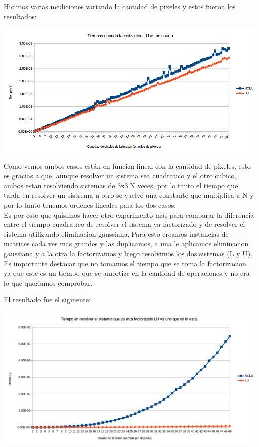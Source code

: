 Hicimos varias mediciones variando la cantidad de pixeles y estos fueron los resultados:

{\centering
    \includegraphics[scale=0.7]{informe/imagenes/LUVSNOLU.PNG} \\
}

Como vemos ambos casos están en funcion lineal con la cantidad de pixeles, esto es gracias a que, aunque resolver un sistema sea cuadratico y el otro cubico, ambos estan resolviendo sistemas de 3x3 N veces, por lo tanto el tiempo que tarda en resolver un sistrema u otro se vuelve una constante que multiplica a N y por lo tanto tenemos ordenes lineales para los dos casos.\\

Es por esto que quisimos hacer otro experimento más para comparar la diferencia entre el tiempo cuadratico de resolver el sistema ya factorizado y de resolver el sistema utilizando eliminacion gaussiana.
Para esto creamos instancias de matrices cada ves mas grandes y las duplicamos, a una le aplicamos eliminacion gaussiana y a la otra la factorizamos y luego resolvimos los dos sistemas (L y U). Es importante destacar que no tomamos el tiempo que se toma la factorizacion ya que este es un tiempo que se amortiza en la cantidad de operaciones y no era lo que queriamos comprobar.

El resultado fue el siguiente:

{\centering
    \includegraphics[scale=0.6]{informe/imagenes/LUVSNOLUDIM.PNG} \\
}

